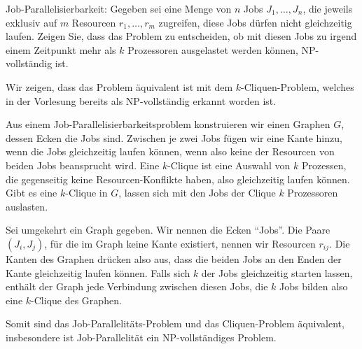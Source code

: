 Job-Parallelisierbarkeit:
Gegeben sei eine Menge von $n$ Jobs $J_1,\dots,J_n$, die jeweils exklusiv
auf $m$ Resourcen $r_1,\dots,r_m$ zugreifen, diese Jobs dürfen
nicht gleichzeitig laufen. Zeigen Sie, dass das Problem zu entscheiden,
ob mit diesen Jobs zu irgend einem Zeitpunkt mehr als $k$ Prozessoren
ausgelastet werden können, NP-vollständig ist.

\begin{loesung}
Wir zeigen, dass das Problem äquivalent ist mit dem $k$-Cliquen-Problem,
welches in der Vorlesung bereits als NP-vollständig erkannt worden ist.

Aus einem Job-Parallelisierbarkeitsproblem konstruieren wir einen Graphen $G$,
dessen Ecken die Jobs sind. Zwischen je zwei Jobs fügen wir eine
Kante hinzu, wenn die Jobs gleichzeitig laufen können, wenn also
keine der Resourcen von beiden Jobs beansprucht wird. Eine $k$-Clique
ist eine Auswahl von $k$ Prozessen, die gegenseitig keine Resourcen-Konflikte
haben, also gleichzeitig laufen können. Gibt es eine $k$-Clique in $G$,
lassen sich mit den Jobs der Clique $k$ Prozessoren auslasten.

Sei umgekehrt ein Graph gegeben. Wir nennen die Ecken ``Jobs''. Die
Paare $(J_i,J_j)$, für die im Graph keine Kante existiert,  nennen
wir Resourcen $r_{ij}$. Die Kanten des Graphen drücken also aus, dass
die beiden Jobs an den Enden der Kante gleichzeitig laufen können.
Falls sich $k$ der Jobs gleichzeitig starten lassen, enthält der
Graph jede Verbindung zwischen diesen Jobs, die $k$ Jobs bilden also
eine $k$-Clique des Graphen.

Somit sind das Job-Parallelitäts-Problem und das Cliquen-Problem
äquivalent, insbesondere ist Job-Parallelität ein NP-vollständiges
Problem.
\end{loesung}
